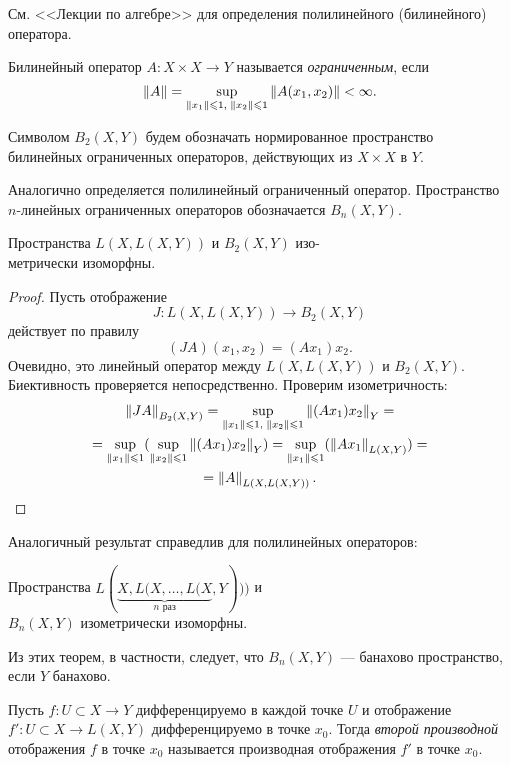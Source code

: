 См. <<Лекции по алгебре>> для определения полилинейного (билинейного) оператора.

\begin{definition}
    Билинейный оператор $A \colon X \times X \to Y$ называется \emph{ограниченным}, если
    \[ \left\|A\right\| = \sup_{\left\|x_1\right\| \leqslant 1, \; \left\|x_2\right\| \leqslant 1} \left\|A(x_1, x_2)\right\| < \infty. \]
\end{definition}
Символом $B_2(X, Y)$ будем обозначать нормированное пространство 
билинейных ограниченных операторов, действующих из $X \times X$ в $Y$.

Аналогично определяется полилинейный ограниченный оператор. Пространство $n$-линейных
ограниченных операторов обозначается $B_n(X, Y)$.

\begin{theorem}
    Пространства $L(X, L(X, Y))$ и $B_2(X, Y)$ изо-\\метрически изоморфны.
\end{theorem}

\begin{proof}
    Пусть отображение 
    \[ J \colon L(X, L(X, Y)) \to B_2(X, Y) \] 
    действует по правилу
    \[ (JA)(x_1, x_2) = (Ax_1)x_2. \]
    Очевидно, это линейный оператор между $L(X, L(X, Y))$ и $B_2(X, Y)$.
    Биективность проверяется непосредственно. Проверим изометричность:
    \begin{multline*}
        \left\|JA\right\|_{B_2(X, Y)} = 
        \sup_{\left\|x_1\right\| \leqslant 1, \; \left\|x_2\right\| \leqslant 1} \left\|(Ax_1)x_2\right\|_{Y} = \\ = 
            \sup_{\left\|x_1\right\| \leqslant 1}(\sup_{\left\|x_2\right\| \leqslant 1} \left\|(Ax_1)x_2\right\|_{Y})  =
            \sup_{\left\|x_1\right\| \leqslant 1}(\left\|Ax_1\right\|_{L(X, Y)}) = \\ = \left\|A\right\|_{L(X, L(X, Y))}.
    \end{multline*}
\end{proof}

Аналогичный результат справедлив для полилинейных операторов:
\begin{theorem}
    Пространства $L(\underbrace{X, L(X, \dotsc, L(X}_{n\text{ раз}}, Y)))$ и \\
    $B_n(X, Y)$ изометрически изоморфны.
\end{theorem}

Из этих теорем, в частности, следует, что $B_n(X, Y)$ --- банахово пространство, если
$Y$ банахово.

\begin{definition}
    Пусть $f \colon U \subset X \to Y$ дифференцируемо в каждой точке $U$ и отображение
    $f' \colon U \subset X \to L(X, Y)$ дифференцируемо в точке $x_0$. Тогда \emph{второй
    производной} отображения $f$ в точке $x_0$ называется производная отображения $f'$ в точке
    $x_0$.
\end{definition}

